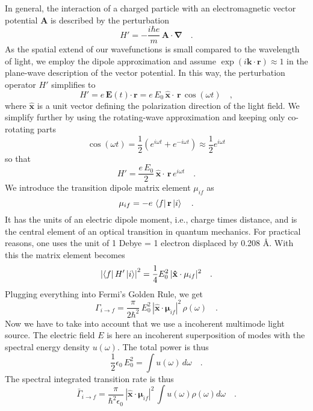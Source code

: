In general, the interaction of a charged particle with an electromagnetic vector potential $\mathbf{A}$ is described by the perturbation
\[
 H' = - \frac{i \hbar e}{m} \, \mathbf{A \cdot \nabla}  \quad .
\]
As the spatial extend of our wavefunctions is small compared to the wavelength of light, we employ the dipole approximation and assume $\exp( i \mathbf{k \cdot r}) \approx 1$ in the plane-wave description of the vector potential. In this way, the  perturbation operator $H'$ simplifies to
\[
 H' =  e \, \mathbf{E} (t)  \mathbf{\cdot \, r} =  e \,E_0 \,  \mathbf{\hat{x} \cdot \, r} \, \cos(\omega t) \quad ,
\]
where $\mathbf{\hat{x}} $ is a unit vector defining the polarization direction of the light field. We simplify further by using the rotating-wave approximation and keeping only co-rotating parts 
\[
 \cos(\omega t)
 = \frac{1}{2} \left( e^{i \omega t}+  e^{-i \omega t} \right)
 \approx  \frac{1}{2}  e^{i \omega t} 
\]
so that 
\[
H' =  \frac{ e \,E_0}{2}  \,  \mathbf{\hat{x} \cdot \, r} \,  e^{i \omega t}  \quad .
\]
%
 We introduce the transition dipole matrix element $\mu_{if}$ as
\[
\mathbf{\mu}_{if} = -e \, \bra{f}    \mathbf{r} \ket{i}  \quad .
\]
It has the units of an electric dipole moment, i.e., charge times distance, and is the central element of an optical transition in quantum mechanics. For practical reasons, one uses the unit of 1 Debye = 1 electron displaced by 0.208 \AA.
With this the matrix element  becomes
\[
\left| \bra{f} H' \ket{i} \right|^2 =  \frac{1}{4} E_0^2  \, |\mathbf{\hat{x}} \cdot \mathbf{\mu}_{if} |^2 \quad .
\]
Plugging everything into Fermi's Golden Rule, we get
\[
 \Gamma_{i \rightarrow f} = \frac{\pi}{2 \hbar^2} \,  E_0^2  \, |\mathbf{\hat{x}} \cdot \mathbf{\mu}_{if} |^2 \, \rho(\omega) \quad .
\]
Now we have to take into account that we use a incoherent multimode light source. The electric field $E$ is here an incoherent superposition of  modes with the  spectral energy density $u(\omega)$.
The total power is thus
\[
 \frac{1}{2} \epsilon_0  \, E_0^2  = \int  u(\omega)  \, d\omega \quad .
\]
The spectral integrated transition rate is thus 
\[
 \bar{\Gamma}_{i \rightarrow f} =   \frac{\pi  }{\hbar^2 \epsilon_0}  \, |\mathbf{\hat{x}} \cdot \mathbf{\mu}_{if} |^2 \,
\int u(\omega)  
  \rho(\omega)  d \omega \quad .
\]
